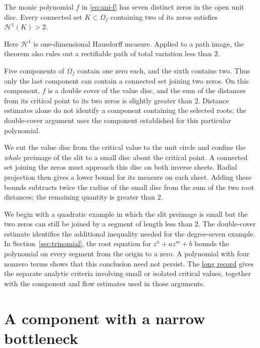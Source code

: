 \documentclass[11pt]{article}
\newcommand{\recordlink}[3]{\href{#1\##2}{#3}}
\begin{document}
\begin{theorem}\label{res:ani-degree-seven-counterexample}
The monic polynomial $f$ in \eqref{eq:ani-f} has seven distinct zeros in
the open unit disc. Every connected set $K\subset\Omega_f$ containing
two of its zeros satisfies $\mathcal H^1(K)>2$.
\end{theorem}

Here $\mathcal H^1$ is one-dimensional Hausdorff measure. Applied to a
path image, the theorem also rules out a rectifiable path of total
variation less than $2$.

Five components of $\Omega_f$ contain one zero each, and the sixth
contains two. Thus only the last component can contain a connected set
joining two zeros. On this component, $f$ is a double cover of the value
disc, and the sum of the distances from its critical point to its two
zeros is slightly greater than $2$. Distance estimates alone do not identify a component containing the
selected roots; the double-cover argument uses the component established
for this particular polynomial.

We cut the value disc from the critical value to the unit circle and
confine the \emph{whole} preimage of the slit to a small disc about the
critical point. A connected set joining the zeros must approach this
disc on both inverse sheets. Radial projection then gives a lower bound
for its measure on each sheet. Adding these bounds subtracts twice the
radius of the small disc from the sum of the two root distances; the
remaining quantity is greater than $2$.

We begin with a quadratic example in which the slit preimage is small
but the two zeros can still be joined by a segment of length less than
$2$. The double-cover estimate identifies the additional inequality
needed for the degree-seven example. In Section~\ref{sec:trinomial}, the
root equation for $z^n+az^m+b$ bounds the polynomial on every segment
from the origin to a zero. A polynomial with four nonzero terms shows
that this conclusion need not persist.
The \recordlink{erdos1041-lemniscate-reasoning-surface.pdf}{scope-further-estimates}
{long record} gives the separate analytic criteria involving small or
isolated critical values, together with the component and flow estimates
used in those arguments.

\section{A component with a narrow bottleneck}\label{sec:counterexample}
\end{document}
